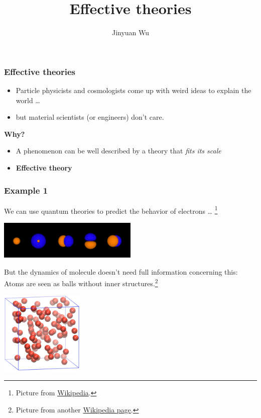 \documentclass{beamer}
\title{Effective theories}
\author{Jinyuan Wu}
\newcommand{\concept}[1]{\textbf{#1}}
\begin{document}
\frame{\titlepage}

\begin{frame}
\frametitle{Effective theories}

\begin{itemize}
    \item Particle physicists and cosmologists come up with weird ideas to explain the world \dots
    \item but material scientists (or engineers) don't care. 
\end{itemize}

\textbf{Why?}

\begin{itemize}
    \item A phenomenon can be well described by a theory that \emph{fits its scale}
    \item \concept{Effective theory}
\end{itemize}

\end{frame}

\begin{frame}
\frametitle{Example 1}

We can use quantum theories to predict the behavior of electrons \dots%
\footnote{
    Picture from \href{https://en.wikipedia.org/wiki/Atomic\_orbital\#/media/File:Neon\_orbitals.png}{Wikipedia}.
}

\begin{center}
    \includegraphics[width=0.5\textwidth]{newtonian/Neon_orbitals.png}
\end{center}

But the dynamics of molecule doesn't need full information concerning this:
Atoms are seen as balls without inner structures.\footnote{
    Picture from another \href{https://en.wikipedia.org/wiki/File:A\_molecular\_dynamics\_simulation\_of\_argon\_gas.webm}{Wikipedia page}.
}

\begin{center}
    \includegraphics[width=0.3\textwidth]{newtonian/wiki-md.PNG}
\end{center}

\end{frame}
\end{document}
